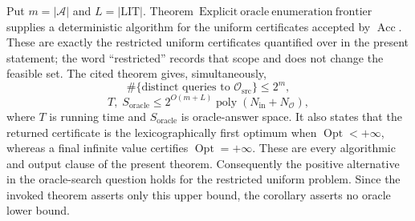 Put \(m=|\mathcal A|\) and \(L=|\mathrm{LIT}|\).  Theorem~\(\mathrm{Explicit\ oracle\ enumeration\ frontier}\) supplies a deterministic algorithm for the uniform certificates accepted by \(\operatorname{Acc}\).  These are exactly the restricted uniform certificates quantified over in the present statement; the word ``restricted'' records that scope and does not change the feasible set.  The cited theorem gives, simultaneously,
\[
 \#\{\text{distinct queries to }\mathcal O_{\mathrm{src}}\}\leq 2^m,
\]
\[
 T,\;S_{\mathrm{oracle}}
 \leq 2^{O(m+L)}\operatorname{poly}(N_{\mathrm{in}}+N_{\mathcal O}),
\]
where \(T\) is running time and \(S_{\mathrm{oracle}}\) is oracle-answer space.  It also states that the returned certificate is the lexicographically first optimum when \(\operatorname{Opt}<+\infty\), whereas a final infinite value certifies \(\operatorname{Opt}=+\infty\).  These are every algorithmic and output clause of the present theorem.  Consequently the positive alternative in the oracle-search question holds for the restricted uniform problem.  Since the invoked theorem asserts only this upper bound, the corollary asserts no oracle lower bound.
